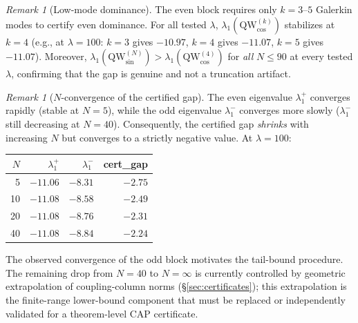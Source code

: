 \documentclass[12pt,a4paper]{article}
\theoremstyle{definition}
\theoremstyle{remark}
\newtheorem{remark}[theorem]{Remark}
\begin{document}
\begin{remark}[Low-mode dominance]
\label{rem:low-mode}
The even block requires only $k = 3$--$5$ Galerkin modes to certify even dominance. For all tested $\lambda$, $\lambda_1(\mathrm{QW}_{\cos}^{(k)})$ stabilizes at $k = 4$ (e.g., at $\lambda = 100$: $k = 3$ gives $-10.97$, $k = 4$ gives $-11.07$, $k = 5$ gives $-11.07$). Moreover, $\lambda_1(\mathrm{QW}_{\sin}^{(N)}) > \lambda_1(\mathrm{QW}_{\cos}^{(4)})$ for \emph{all} $N \leq 90$ at every tested $\lambda$, confirming that the gap is genuine and not a truncation artifact.
\end{remark}

\begin{remark}[$N$-convergence of the certified gap]
\label{rem:N-convergence}
The even eigenvalue $\lambda_1^+$ converges rapidly (stable at $N = 5$), while the odd eigenvalue $\lambda_1^-$ converges more slowly ($\lambda_1^-$ still decreasing at $N = 40$). Consequently, the certified gap \emph{shrinks} with increasing $N$ but converges to a strictly negative value. At $\lambda = 100$:

\begin{center}
\small
\begin{tabular}{r|r|r|r}
$N$ & $\lambda_1^+$ & $\lambda_1^-$ & cert\_gap \\\hline
5 & $-11.06$ & $-8.31$ & $-2.75$ \\
10 & $-11.08$ & $-8.58$ & $-2.49$ \\
20 & $-11.08$ & $-8.76$ & $-2.31$ \\
40 & $-11.08$ & $-8.84$ & $-2.24$
\end{tabular}
\end{center}

\noindent The observed convergence of the odd block motivates the tail-bound procedure. The remaining drop from $N = 40$ to $N = \infty$ is currently controlled by geometric extrapolation of coupling-column norms (\S\ref{sec:certificates}); this extrapolation is the finite-range lower-bound component that must be replaced or independently validated for a theorem-level CAP certificate.
\end{remark}
\end{document}

